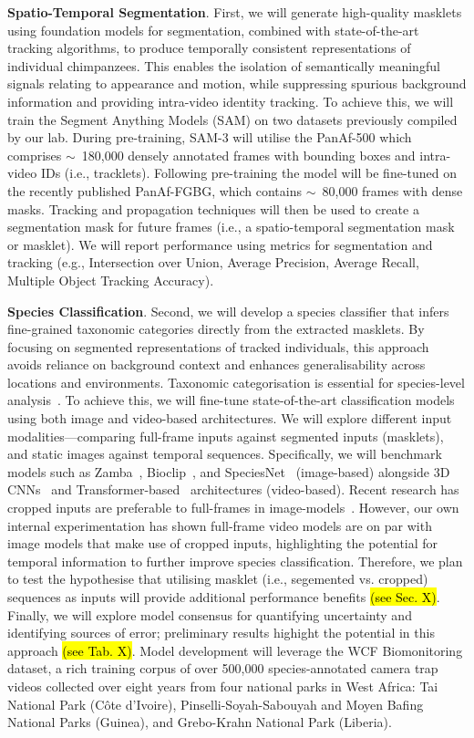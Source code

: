 \documentclass{article}
\begin{document}
\textbf{Spatio-Temporal Segmentation}. First, we will generate high-quality masklets using foundation models for segmentation, combined with state-of-the-art tracking algorithms, to produce temporally consistent representations of individual chimpanzees. This enables the isolation of semantically meaningful signals relating to appearance and motion, while suppressing spurious background information and providing intra-video identity tracking. To achieve this, we will train the Segment Anything Models (SAM) on two datasets previously compiled by our lab. During pre-training, SAM-3 will utilise the PanAf-500 which comprises $\sim$~180,000 densely annotated frames with bounding boxes and intra-video IDs (i.e., tracklets). Following pre-training the model will be fine-tuned on the recently published PanAf-FGBG, which contains $\sim$~80,000 frames with dense masks. Tracking and propagation techniques will then be used to create a segmentation mask for future frames (i.e., a spatio-temporal segmentation mask or masklet). We will report performance using metrics for segmentation and tracking (e.g., Intersection over Union, Average Precision, Average Recall, Multiple Object Tracking Accuracy).


\textbf{Species Classification}. Second, we will develop a species classifier that infers fine-grained taxonomic categories directly from the extracted masklets. By focusing on segmented representations of tracked individuals, this approach avoids reliance on background context and enhances generalisability across locations and environments. Taxonomic categorisation is essential for species-level analysis~\cite{}. To achieve this, we will fine-tune state-of-the-art classification models using both image and video-based architectures. We will explore different input modalities—comparing full-frame inputs against segmented inputs (masklets), and static images against temporal sequences. Specifically, we will benchmark models such as Zamba~\cite{}, Bioclip~\cite{}, and SpeciesNet~\cite{} (image-based) alongside 3D CNNs~\cite{} and Transformer-based~\cite{} architectures (video-based). Recent research has cropped inputs are preferable to full-frames in image-models~\cite{}. However, our own internal experimentation has shown full-frame video models are on par with image models that make use of cropped inputs, highlighting the potential for temporal information to further improve species classification. Therefore, we plan to test the hypothesise that utilising masklet (i.e., segemented vs. cropped) sequences as inputs will provide additional performance benefits \hl{(see Sec. X)}. Finally, we will explore model consensus for quantifying uncertainty and identifying sources of error; preliminary results highight the potential in this approach \hl{(see Tab. X)}. Model development will leverage the WCF Biomonitoring dataset, a rich training corpus of over 500,000 species-annotated camera trap videos collected over eight years from four national parks in West Africa: Tai National Park (Côte d’Ivoire), Pinselli-Soyah-Sabouyah and Moyen Bafing National Parks (Guinea), and Grebo-Krahn National Park (Liberia).
\end{document}

